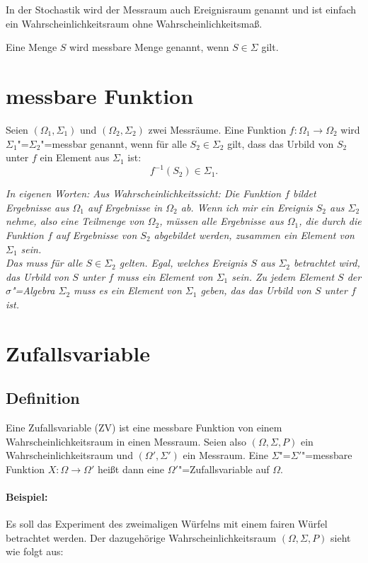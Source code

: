 \documentclass[paper=a4,10pt]{scrartcl}
\begin{document}
\noindent
In der Stochastik wird der Messraum auch Ereignisraum genannt und ist einfach ein Wahrscheinlichkeitsraum ohne Wahrscheinlichkeitsmaß.

\noindent
Eine Menge $S$ wird messbare Menge genannt, wenn $S \in \Sigma$ gilt.

\section{messbare Funktion} \label{sec:messbar}
Seien $(\Omega_1, \Sigma_1)$ und $(\Omega_2, \Sigma_2)$ zwei Messräume. Eine Funktion $f: \Omega_1 \rightarrow \Omega_2$ wird $\Sigma_1$"=$\Sigma_2$"=messbar genannt, wenn für alle $S_2 \in \Sigma_2$ gilt, dass das Urbild von $S_2$ unter $f$ ein Element aus $\Sigma_1$ ist:
\begin{equation}
f^{-1}(S_2) \in \Sigma_1.
\end{equation}

\noindent
\textit{In eigenen Worten: Aus Wahrscheinlichkeitssicht: Die Funktion $f$ bildet Ergebnisse aus $\Omega_1$ auf Ergebnisse in $\Omega_2$ ab. Wenn ich mir ein Ereignis $S_2$ aus $\Sigma_2$ nehme, also eine Teilmenge von $\Omega_2$, müssen alle Ergebnisse aus $\Omega_1$, die durch die Funktion $f$ auf Ergebnisse von $S_2$ abgebildet werden, zusammen ein Element von $\Sigma_1$ sein. \\
Das muss für alle $S \in  \Sigma_2$ gelten. Egal, welches Ereignis $S$ aus $\Sigma_2$ betrachtet wird, das Urbild von $S$ unter $f$ muss ein Element von $\Sigma_1$ sein. Zu jedem Element $S$ der $\sigma$"=Algebra $\Sigma_2$ muss es ein Element von $\Sigma_1$ geben, das das Urbild von $S$ unter $f$ ist.}

\section{Zufallsvariable}
\subsection{Definition}
Eine Zufallsvariable (ZV) ist eine messbare Funktion von einem Wahrscheinlichkeitsraum in einen Messraum. Seien also $(\Omega, \Sigma , P)$ ein Wahrscheinlichkeitsraum und $(\Omega', \Sigma')$ ein Messraum. Eine $\Sigma$"=$\Sigma'$"=messbare Funktion $X:\Omega \rightarrow \Omega'$ heißt dann eine $\Omega'$"=Zufallsvariable auf $\Omega$.

\paragraph{Beispiel:} Es soll das Experiment des zweimaligen Würfelns mit einem fairen Würfel betrachtet werden. Der dazugehörige Wahrscheinlichkeitsraum $(\Omega, \Sigma, P)$ sieht wie folgt aus:
\end{document}
